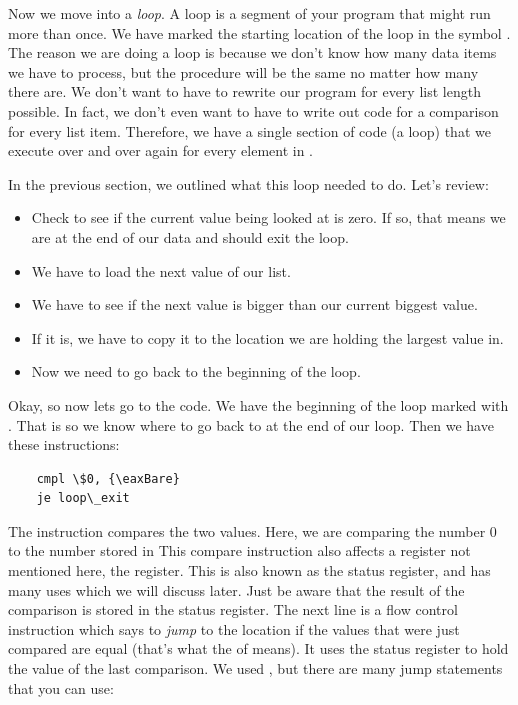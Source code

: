 Now we move into a \emph{loop}.  
A loop is a segment of your program that might run more than once.  We have marked the starting
location of the loop in the symbol .  The
reason we are doing a loop is because we don't know how many
data items we have to process, but the procedure will be the same no
matter how many there are.  We don't want to have to rewrite our program for 
every list length possible.  In fact, we don't even want to have to write out
code for a comparison for every list item.  Therefore, we have a single 
section of code (a loop) that we execute over and over again for every 
element in .

In the previous section, we outlined what this loop needed to do.  Let's
review:

\begin{itemize}\item Check to see if the current value being looked at is zero.  If so, that means we are at the end of our data and should exit the loop. 
\item We have to load the next value of our list. 
\item We have to see if the next value is bigger than our current biggest value. 
\item If it is, we have to copy it to the location we are holding the largest value in. 
\item Now we need to go back to the beginning of the loop. 
\end{itemize}

Okay, so now lets go to the code.  We have the beginning of the loop 
marked with .  That is so we know where to go back
to at the end of our loop.  Then we have these instructions:

\begin{simpletyping}
\begin{lstlisting}
	cmpl \$0, {\eaxBare}
	je loop\_exit
\end{lstlisting}
\end{simpletyping}

The  instruction compares the two values.  Here,
we are comparing the number 0 to the number stored in {\eaxReg}
This compare instruction also affects a register not mentioned here, the
{\eflagsRegIdx} register.  This is also known as the status register,
and has many uses which we will discuss later.  Just be aware that the
result of the comparison is stored in the status register.  The next line
is a flow control instruction which says to 
\emph{jump} to the  location
if the values that were just compared are equal (that's what the 
of  means).  It uses the status register to hold the 
value of
the last comparison.  We used , but there are many jump 
statements that you can use:

